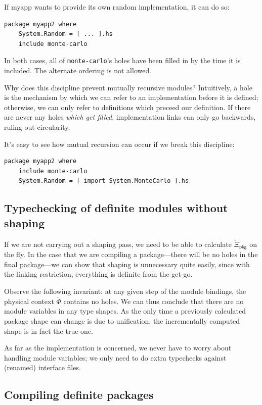\documentclass{article}
\begin{document}
If myapp wants to provide its own random implementation, it can do so:

\begin{verbatim}
package myapp2 where
    System.Random = [ ... ].hs
    include monte-carlo
\end{verbatim}

In both cases, all of \verb|monte-carlo|'s holes have been filled in by the time
it is included.  The alternate ordering is not allowed.

Why does this discipline prevent mutually recursive modules?  Intuitively,
a hole is the mechanism by which we can refer to an implementation
before it is defined; otherwise, we can only refer to definitions which
preceed our definition. If there are never any holes \emph{which get filled},
implementation links can only go backwards, ruling out circularity.

It's easy to see how mutual recursion can occur if we break this discipline:

\begin{verbatim}
package myapp2 where
    include monte-carlo
    System.Random = [ import System.MonteCarlo ].hs
\end{verbatim}

\subsection{Typechecking of definite modules without shaping}

If we are not carrying out a shaping pass, we need to be able to calculate
$\widetilde{\Xi}_{\mathsf{pkg}}$ on the fly.  In the case that we are
compiling a package---there will be no holes in the final package---we
can show that shaping is unnecessary quite easily, since with the
linking restriction, everything is definite from the get-go.

Observe the following invariant: at any given step of the module
bindings, the physical context $\widetilde{\Phi}$ contains no
holes.  We can thus conclude that there are no module variables in any
type shapes.  As the only time a previously calculated package shape can
change is due to unification, the incrementally computed shape is in
fact the true one.

As far as the implementation is concerned, we never have to worry
about handling module variables; we only need to do extra typechecks
against (renamed) interface files.

\subsection{Compiling definite packages}\label{sec:compiling}
\end{document}
